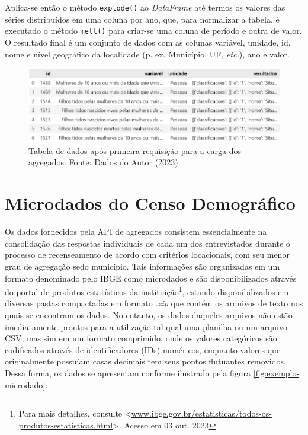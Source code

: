     Aplica-se então o método \verb|explode()| ao \textit{DataFrame} até termos os valores das séries distribuídos em uma coluna por ano, que, para normalizar a tabela, é executado o método \verb|melt()| para criar-se uma coluna de período e outra de valor. O resultado final é um conjunto de dados com as colunas variável, unidade, id, nome e nível geográfico da localidade (p. ex. Município, UF, \textit{etc.}), ano e valor.

\begin{figure}[ht]
    \centering
    \includegraphics[width=\textwidth]{files/img/tabela_agregado_pt1.png}
    \caption{Tabela de dados após primeira requisição para a carga dos agregados. Fonte: Dados do Autor (2023).}
    \label{fig:tabela-agregado-pt1}
\end{figure}



    


\section{Microdados do Censo Demográfico}
\label{sec-microdados}

    Os dados fornecidos pela API de agregados consistem essencialmente na consolidação das respostas individuais de cada um dos entrevistados durante o processo de recenseamento de acordo com critérios locacionais, com seu menor grau de agregação sedo município. Tais informações são organizadas em um formato denominado pelo IBGE como microdados e são disponibilizados através do portal de produtos estatísticos da instituição\footnote{Para mais detalhes, consulte <\url{www.ibge.gov.br/estatisticas/todos-os-produtos-estatisticas.html}>. Acesso em 03 out. 2023}, estando disponibilizados em diversas pastas compactadas em formato \textit{.zip} que contém os arquivos de texto nos quais se encontram os dados. No entanto, os dados daqueles arquivos não estão imediatamente prontos para a utilização tal qual uma planilha ou um arquivo CSV, mas sim em um formato comprimido, onde os valores categóricos são codificados através de identificadores (IDs) numéricos, enquanto valores que originalmente possuíam casas decimais tem seus pontos flutuantes removidos. Dessa forma, os dados se apresentam conforme ilustrado pela figura \ref{fig:exemplo-microdado}:

